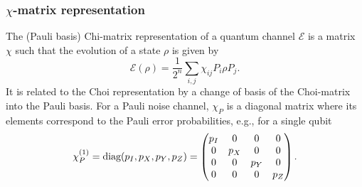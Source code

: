 \documentclass{article}
\begin{document}
\subsubsection*{$\chi$-matrix representation}
The (Pauli basis) Chi-matrix representation of a quantum channel $\mathcal{E}$ is a matrix $\chi$ such that the evolution of a state $\rho$ is given by
\begin{equation}
    \mathcal{E}(\rho)=\frac{1}{2^n}\sum_{i,j}\chi_{ij}P_i\rho P_j.
\end{equation}
It is related to the Choi representation by a change of basis of the Choi-matrix into the Pauli basis. For a Pauli noise channel, $\chi_P$ is a diagonal matrix where its elements correspond to the Pauli error probabilities, e.g., for a single qubit
\begin{equation}
        \chi_P^{(1)} = \text{diag}(p_I, p_X, p_Y, p_Z) \\
        =
        \begin{pmatrix}
        p_I & 0 & 0 & 0\\
        0 & p_X & 0 & 0\\
        0 & 0 & p_Y & 0\\
        0 & 0 & 0 & p_Z
        \end{pmatrix}.
\end{equation}
\end{document}
